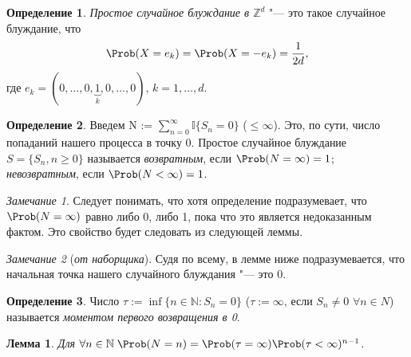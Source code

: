 \documentclass[a4paper]{article}
\theoremstyle{plain}
\newtheorem{lem}[thm]{Лемма}
\theoremstyle{definition}
\newtheorem{defn}{Определение}[section]
\theoremstyle{remark}
\newtheorem*{rem}{Замечание}
\begin{document}
\begin{defn}
  \emph{Простое случайное блуждание в $\mathbb{Z}^{d}$} "--- это такое случайное блуждание, что
  \begin{equation*}
    \Prob(X = e_{k}) = \Prob(X = -e_{k}) = \frac{1}{2d},
  \end{equation*}
  где $e_{k} = (0, \ldots, 0, \underbrace{1}_{k}, 0, \ldots, 0)$, $k = 1, \ldots, d$.
\end{defn}

\begin{defn}
  Введем N := $\sum\limits_{n=0}^\infty \mathbb{I} \lbrace S_{n} = 0 \rbrace$ ($\leqslant \infty$). Это, по сути, число попаданий нашего процесса в точку 0. Простое случайное блуждание $S = \lbrace S_{n}, n \geqslant 0\rbrace$ называется \emph{возвратным}, если $\Prob(N = \infty) = 1$; \emph{невозвратным}, если $\Prob(N < \infty) = 1$.
\end{defn}

\begin{rem}
  Следует понимать, что хотя определение подразумевает, что $\Prob(N = \infty)$ равно либо 0, либо 1, пока что это является недоказанным фактом. Это свойство будет следовать из следующей леммы.
\end{rem}

\begin{rem}[\emph{от наборщика}]
  Судя по всему, в лемме ниже подразумевается, что начальная точка нашего случайного блуждания "--- это 0.
\end{rem}
\begin{defn}
  Число $\tau := \inf\lbrace n \in \mathbb{N} : S_{n} = 0 \rbrace$ ($\tau := \infty$, если $S_{n} \neq 0$ $\forall n \in N$) называется \emph{моментом первого возвращения в 0}.
\end{defn}

\begin{lem}
  Для  $ \forall n \in \mathbb{N} \; \Prob(N = n)  =  \Prob(\tau = \infty)\Prob(\tau < \infty)^{n-1}$.
\end{lem}
\end{document}
